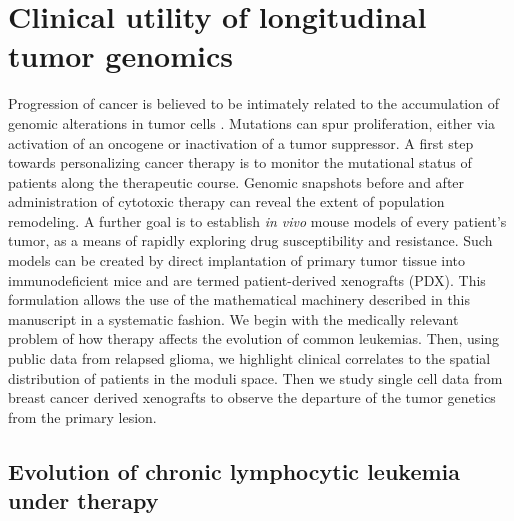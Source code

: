 \documentclass[a4paper,11pt]{article}
\begin{document}

\section{Clinical utility of longitudinal tumor genomics}\label{sec:cancer}

Progression of cancer is believed to be intimately related to the accumulation of genomic alterations in tumor cells \cite{nowell1976clonal}.
Mutations can spur proliferation, either via activation of an oncogene or inactivation of a tumor suppressor.
A first step towards personalizing cancer therapy is to monitor the mutational status of patients along the therapeutic course.
Genomic snapshots before and after administration of cytotoxic therapy can reveal the extent of population remodeling.
A further goal is to establish \textit{in vivo} mouse models of every patient's tumor, as a means of rapidly exploring drug susceptibility and resistance.
Such models can be created by direct implantation of primary tumor tissue into immunodeficient mice and are termed patient-derived xenografts (PDX). This formulation allows the use of the mathematical machinery described in this manuscript in a systematic fashion. We begin with the medically relevant problem of how therapy affects the evolution of common leukemias. Then, using public data from relapsed glioma, we highlight clinical correlates to the spatial distribution of patients in the moduli space. Then we study single cell data from breast cancer derived xenografts to observe the departure of the tumor genetics from the primary lesion.  

\subsection{Evolution of chronic lymphocytic leukemia under therapy}
\end{document}
